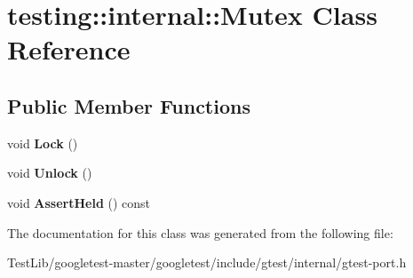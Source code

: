 \hypertarget{classtesting_1_1internal_1_1Mutex}{}\section{testing\+:\+:internal\+:\+:Mutex Class Reference}
\label{classtesting_1_1internal_1_1Mutex}
\subsection*{Public Member Functions}
\begin{DoxyCompactItemize}
\item 
\mbox{\label{classtesting_1_1internal_1_1Mutex_ae7e2191886c00182176b23c4f4d049f8}} 
void {\bfseries Lock} ()
\item 
\mbox{\label{classtesting_1_1internal_1_1Mutex_a315188055de1be98884519ad84eff2e6}} 
void {\bfseries Unlock} ()
\item 
\mbox{\label{classtesting_1_1internal_1_1Mutex_af45bf1660ac4110338a02a8680b2f486}} 
void {\bfseries Assert\+Held} () const
\end{DoxyCompactItemize}


The documentation for this class was generated from the following file\+:\begin{DoxyCompactItemize}
\item 
Test\+Lib/googletest-\/master/googletest/include/gtest/internal/gtest-\/port.\+h\end{DoxyCompactItemize}

